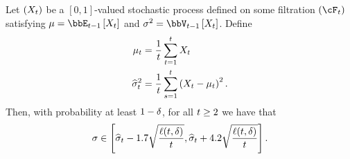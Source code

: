 \begin{lemma}\label{lem:stdev-concentration}
        Let $(X_{t})$ be a $[0, 1]$-valued stochastic process defined on some filtration $(\cF_\round)$ satisfying $\mean = \E[\round - 1]{X_\round}$ and $\var = \V[\round - 1]{X_\round}$.
        Define
        \begin{align}
            \empmean[\round] &= \frac{1}{\round} \sum_{\round = 1}^{\round} X_\round \\
            \empvar[\round] &= \frac{1}{\round} \sum_{\timeidx = 1}^{\round} \paren{X_\round - \empmean[\round]}^2.
        \end{align}
        Then, with probability at least $1 - \delta$, for all $t \geq 2$ we have that
        \begin{equation}
            \stdev \in \sbrk{
                \empstdev[\round] - 1.7 \sqrt{\frac{\ell(\round, \errorProb)}{\round}}, 
                \empstdev[\round] + 4.2 \sqrt{\frac{\ell(\round, \errorProb)}{\round}}
            }.
        \end{equation}
\end{lemma}
